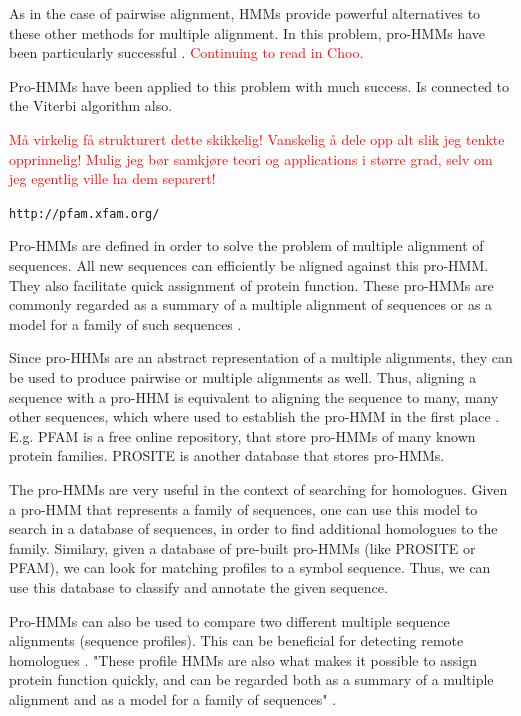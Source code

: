 \documentclass{article}
\begin{document}
As in the case of pairwise alignment, HMMs provide powerful alternatives to these other methods for multiple alignment. In this problem, pro-HMMs have been particularly successful \cite{Choo2004}. \textcolor{red}{Continuing to read in Choo.}

Pro-HMMs have been applied to this problem with much success. Is connected to the Viterbi algorithm also.   

\textcolor{red}{Må virkelig få strukturert dette skikkelig! Vanskelig å dele opp alt slik jeg tenkte opprinnelig! Mulig jeg bør samkjøre teori og applications i større grad, selv om jeg egentlig ville ha dem separert!}

\verb$http://pfam.xfam.org/$

Pro-HMMs are defined in order to solve the problem of multiple alignment of sequences. All new sequences can efficiently be aligned against this pro-HMM. They also facilitate quick assignment of protein function. These pro-HMMs are commonly regarded as a summary of a multiple alignment of sequences or as a model for a family of such sequences \cite{Christianini2006}. 

Since pro-HHMs are an abstract representation of a multiple alignments, they can be used to produce pairwise or multiple alignments as well. Thus, aligning a sequence with a pro-HHM is equivalent to aligning the sequence to many, many other sequences, which where used to establish the pro-HMM in the first place \cite{Christianini2006}. E.g. PFAM is a free online repository, that store pro-HMMs of many known protein families. PROSITE is another database that stores pro-HMMs. 

The pro-HMMs are very useful in the context of searching for homologues. Given a pro-HMM that represents a family of sequences, one can use this model to search in a database of sequences, in order to find additional homologues to the family. Similary, given a database of pre-built pro-HMMs (like PROSITE or PFAM), we can look for matching profiles to a symbol sequence. Thus, we can use this database to classify and annotate the given sequence. 

Pro-HMMs can also be used to compare two different multiple sequence alignments (sequence profiles). This can be beneficial for detecting remote homologues \cite{Yoon2009}. "These proﬁle HMMs are also what makes it possible to assign protein function quickly, and can be regarded both as a summary of a multiple alignment and as a model for a family of sequences" \cite{Christianini2006}.
\end{document}
